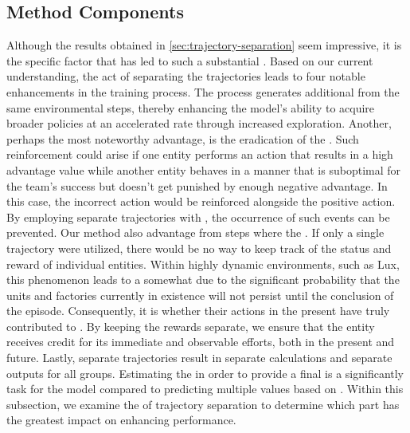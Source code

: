 \subsection{Method Components}
\label{subsec:methodcomp}

\noindent Although the results obtained in \autoref{sec:trajectory-separation} seem impressive, it is  the specific factor that has led to such a substantial . Based on our current understanding, the act of separating the trajectories leads to four notable enhancements in the training process. The process generates additional  from the same environmental steps, thereby enhancing the model's ability to acquire broader policies at an accelerated rate through increased exploration. Another, perhaps the most noteworthy advantage, is the eradication of the . Such reinforcement could arise if one entity performs an action that results in a high advantage value while another entity behaves in a manner that is suboptimal for the team's success but doesn't get punished by enough negative advantage. In this case, the incorrect action would be reinforced alongside the positive action. By employing separate trajectories with , the occurrence of such events can be prevented. Our method also  advantage from steps where the . If only a single trajectory were utilized, there would be no way to keep track of the status and reward of individual entities. Within highly dynamic environments, such as Lux, this phenomenon leads to a somewhat  due to the significant probability that the units and factories currently in existence will not persist until the conclusion of the episode. Consequently, it is  whether their actions in the present have truly contributed to . By keeping the rewards separate, we ensure that the entity receives credit for its immediate and observable efforts, both in the present and future. Lastly, separate trajectories result in separate  calculations and separate  outputs for all groups. Estimating the  in order to provide a final  is a significantly  task for the model compared to predicting multiple values based on . Within this subsection, we examine the  of trajectory separation to determine which part has the greatest impact on enhancing performance.

